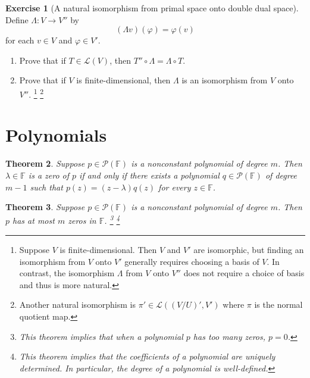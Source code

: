 \documentclass{tufte-handout}
\theoremstyle{plain} %
\newtheorem{thm}{Theorem}
\theoremstyle{definition}
\newtheorem{exer}[thm]{Exercise}
\theoremstyle{remark}
\newcommand{\bra}[1]{\mathopen{}\left(#1\right)}
\renewcommand{\phi}{\varphi}
\newcommand{\F}{\mathbb{F}}
\renewcommand{\L}{\mathcal{L}}
\renewcommand{\P}{\mathcal{P}}
\begin{document}
\begin{exer}[A natural isomorphism from primal space onto double dual space]
	Define $\Lambda:V\to V''$ by
	\[(\Lambda v)(\phi)=\phi(v)\]
	for each $v\in V$ and $\phi\in V'$.
	\begin{enumerate}
		\item Prove that if $T\in\L(V)$, then $T''\circ\Lambda=\Lambda\circ T$.
		\item Prove that if $V$ is finite-dimensional, then $\Lambda$ is an isomorphism from $V$ onto $V''$.%
    	\footnote{Suppose $V$ is finite-dimensional. Then $V$ and $V'$ are isomorphic, but finding an isomorphism from $V$ onto $V'$ generally requires choosing a basis of $V$. In contrast, the isomorphism $\Lambda$ from $V$ onto $V''$ does not require a choice of basis and thus is more natural.}%
		\footnote{Another natural isomorphism is $\pi'\in\L\bra{(V/U)',V'}$ where $\pi$ is the normal quotient map.}
	\end{enumerate}
\end{exer}


\section{Polynomials}
\begin{thm}
	Suppose $p\in\P(\F)$ is a nonconstant polynomial of degree $m$. Then $\lambda\in\F$ is a zero of $p$ if and only if there exists a polynomial $q\in\P(\F)$ of degree $m-1$ such that $p(z)=(z-\lambda)q(z)$ for every $z\in\F$.
\end{thm}

\begin{thm}
	Suppose $p\in\P(\F)$ is a nonconstant polynomial of degree $m$. Then $p$ has at most $m$ zeros in $\F$.%
	\footnote{This theorem implies that when a polynomial $p$ has too many zeros, $p=0$.}%
    \footnote{This theorem implies that the coefficients of a polynomial are uniquely determined. In particular, the \emph{degree} of a polynomial is well-defined.}
\end{thm}
\end{document}
